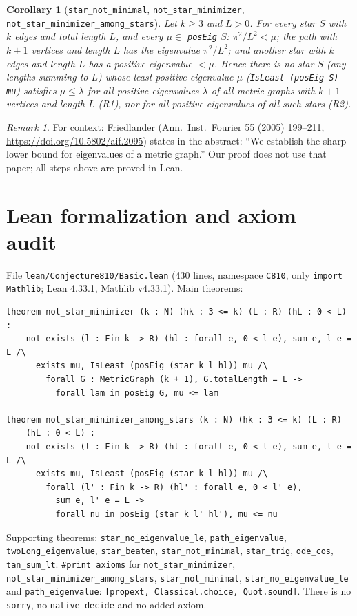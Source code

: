 \documentclass[11pt]{article}
\newtheorem{corollary}[theorem]{Corollary}
\theoremstyle{definition}
\theoremstyle{remark}
\newtheorem{remark}[theorem]{Remark}
\begin{document}
\begin{corollary}[\texttt{star\_not\_minimal}, \texttt{not\_star\_minimizer},
\texttt{not\_star\_minimizer\_among\_stars}]
Let $k\ge 3$ and $L>0$. For every star $S$ with $k$ edges and total length $L$, and every
$\mu\in$ \texttt{posEig} $S$: $\pi^2/L^2<\mu$; the path with $k+1$ vertices and length $L$ has
the eigenvalue $\pi^2/L^2$; and another star with $k$ edges and length $L$ has a positive eigenvalue
$<\mu$. Hence there is no star $S$ (any lengths summing to $L$) whose least positive eigenvalue
$\mu$ (\texttt{IsLeast (posEig S) mu}) satisfies $\mu\le\lambda$ for all positive eigenvalues $\lambda$
of all metric graphs with $k+1$ vertices and length $L$ (R1), nor for all positive eigenvalues of all
such stars (R2).
\end{corollary}

\begin{remark}
For context: Friedlander (Ann.\ Inst.\ Fourier 55 (2005) 199--211,
\url{https://doi.org/10.5802/aif.2095}) states in the abstract: ``We establish the sharp lower bound
for eigenvalues of a metric graph.'' Our proof does not use that paper; all steps above are proved in
Lean.
\end{remark}

\section{Lean formalization and axiom audit}

File \texttt{lean/Conjecture810/Basic.lean} (430 lines, namespace \texttt{C810}, only
\texttt{import Mathlib}; Lean 4.33.1, Mathlib v4.33.1). Main theorems:
\begin{verbatim}
theorem not_star_minimizer (k : N) (hk : 3 <= k) (L : R) (hL : 0 < L) :
    not exists (l : Fin k -> R) (hl : forall e, 0 < l e), sum e, l e = L /\
      exists mu, IsLeast (posEig (star k l hl)) mu /\
        forall G : MetricGraph (k + 1), G.totalLength = L ->
          forall lam in posEig G, mu <= lam

theorem not_star_minimizer_among_stars (k : N) (hk : 3 <= k) (L : R)
    (hL : 0 < L) :
    not exists (l : Fin k -> R) (hl : forall e, 0 < l e), sum e, l e = L /\
      exists mu, IsLeast (posEig (star k l hl)) mu /\
        forall (l' : Fin k -> R) (hl' : forall e, 0 < l' e),
          sum e, l' e = L ->
          forall nu in posEig (star k l' hl'), mu <= nu
\end{verbatim}
Supporting theorems: \texttt{star\_no\_eigenvalue\_le}, \texttt{path\_eigenvalue},
\texttt{twoLong\_eigenvalue}, \texttt{star\_beaten}, \texttt{star\_not\_minimal}, \texttt{star\_trig},
\texttt{ode\_cos}, \texttt{tan\_sum\_lt}.
\texttt{\#print axioms} for \texttt{not\_star\_minimizer}, \texttt{not\_star\_minimizer\_among\_stars},
\texttt{star\_not\_minimal}, \texttt{star\_no\_eigenvalue\_le} and \texttt{path\_eigenvalue}:
\texttt{[propext, Classical.choice, Quot.sound]}. There is no \texttt{sorry}, no
\texttt{native\_decide} and no added axiom.
\end{document}
